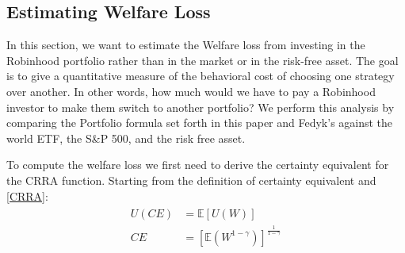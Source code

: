 %
%

\subsection{Estimating Welfare Loss}
In this section, we want to estimate the Welfare loss from investing in the Robinhood portfolio rather than in the market or in the risk-free asset.
The goal is to give a quantitative measure of the behavioral cost of choosing one strategy over another.
In other words, how much would we have to pay a Robinhood investor to make them switch to another portfolio?
We perform this analysis by comparing the Portfolio formula set forth in this paper and Fedyk's against the world ETF, the S\&P 500, and the risk free asset. 

To compute the welfare loss we first need to derive the certainty equivalent for the CRRA function.
Starting from the definition of certainty equivalent and \ref{CRRA}:
\begin{align}
\begin{split}
    U(CE) &= \mathbb{E}[U(W)] \\
    CE &= \left[\mathbb{E}(W^{1-\gamma})\right]^{\frac{1}{1-\gamma}}
\end{split}
\label{ce_crra}
\end{align}

